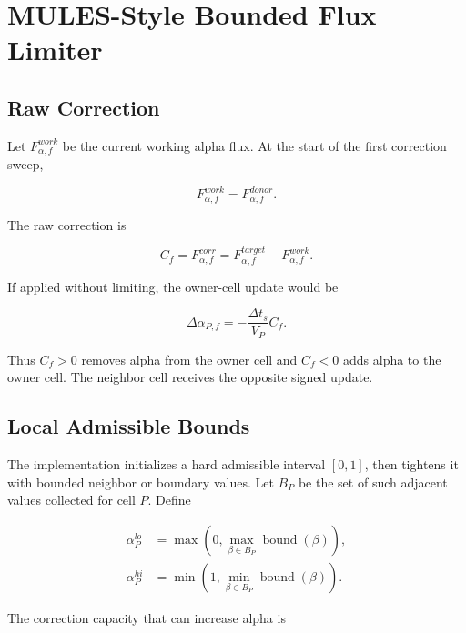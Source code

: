 \documentclass[11pt]{article}
\newcommand{\bnd}{\operatorname{bound}}
\begin{document}
\section{MULES-Style Bounded Flux Limiter}

\subsection{Raw Correction}

Let \(F_{\alpha,f}^{work}\) be the current working alpha flux.  At the start of
the first correction sweep,

\begin{equation}
  F_{\alpha,f}^{work}=F_{\alpha,f}^{donor}.
\end{equation}

The raw correction is

\begin{equation}
  C_f
  =
  F_{\alpha,f}^{corr}
  =
  F_{\alpha,f}^{target}
  -
  F_{\alpha,f}^{work}.
  \label{eq:raw-correction}
\end{equation}

If applied without limiting, the owner-cell update would be

\begin{equation}
  \Delta\alpha_{P,f}
  =
  -\frac{\Delta t_s}{V_P}C_f.
  \label{eq:owner-correction-update}
\end{equation}

Thus \(C_f>0\) removes alpha from the owner cell and \(C_f<0\) adds alpha to
the owner cell.  The neighbor cell receives the opposite signed update.

\subsection{Local Admissible Bounds}

The implementation initializes a hard admissible interval \([0,1]\), then
tightens it with bounded neighbor or boundary values.  Let \(B_P\) be the set
of such adjacent values collected for cell \(P\).  Define

\begin{align}
  \alpha_P^{lo}
  &=
  \max
  \left(
    0,\max_{\beta\in B_P}\bnd(\beta)
  \right),
  \\
  \alpha_P^{hi}
  &=
  \min
  \left(
    1,\min_{\beta\in B_P}\bnd(\beta)
  \right).
\end{align}

The correction capacity that can increase alpha is
\end{document}
